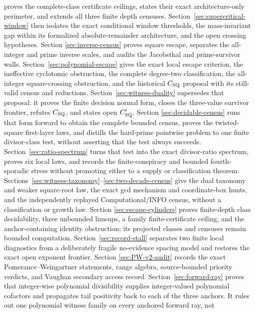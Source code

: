 \documentclass[10pt,reqno]{amsart}
\theoremstyle{definition}
\newcommand{\1}{\mathbf 1}
\begin{document}
\begin{enumerate}[leftmargin=*,label=(\roman*)]
proves the complete-class certificate ceilings, states their exact
architecture-only perimeter, and extends all three finite depth censuses.
Section~\ref{sec:supercritical-window} then isolates the exact conditional
window thresholds, the mass-invariant gap within its formalized
absolute-remainder architecture, and the open crossing hypotheses.  Section
\ref{sec:inverse-census} proves square escape, separates the all-integer and
prime inverse scales, and audits the Jacobsthal and prime-survivor walls.
Section~\ref{sec:polynomial-escape} gives the exact local escape criterion,
the ineffective cyclotomic obstruction, the complete degree-two
classification, the all-integer square-crossing obstruction, and the
historical $C_{\rm SQ}$ proposal with its still-valid census and reductions.
Section~\ref{sec:witness-duality} supersedes that proposal: it proves the
finite decision normal form, closes the three-value survivor frontier,
refutes $C_{\rm SQ}$, and states open $C_{\rm SQ}'$.  Section
\ref{sec:decidable-census} runs that form forward to obtain the complete
bounded census, proves the twisted-square first-layer laws, and distills the
hard-prime pointwise problem to one finite divisor-class test, without
asserting that the test always succeeds.  Section~\ref{sec:ratio-spectrum}
turns that test into the exact divisor-ratio spectrum, proves six local
laws, and records the finite-conspiracy and bounded fourth-sporadic stress
without promoting either to a supply or classification theorem.
Sections~\ref{sec:witness-taxonomy}--\ref{sec:two-decade-census} give the
dual taxonomy and weaker square-root law, the exact gcd mechanism and
coordinate-box hunts, and the independently replayed Computational/INFO
census, without a classification or growth law.  Section
\ref{sec:escape-cylinders} proves finite-depth class decidability,
three unbounded limsups, a family finite-certificate ceiling, and the
anchor-containing identity obstruction; its projected classes and censuses
remain bounded computation.  Section~\ref{sec:record-stall} separates two
finite local diagnostics from a deliberately fragile no-evidence spacing
model and restores the exact open exponent frontier.  Section
\ref{sec:PW-v2-audit} records the exact Pomerance--Weingartner statements,
range algebra, source-bounded priority verdicts, and Vaughan secondary
access record.  Section~\ref{sec:forward-ray} proves that integer-wise
polynomial divisibility supplies integer-valued polynomial cofactors and
propagates tail positivity back to each of the three anchors.  It rules out
one polynomial witness family on every anchored forward ray, not

\end{enumerate}
\end{document}
